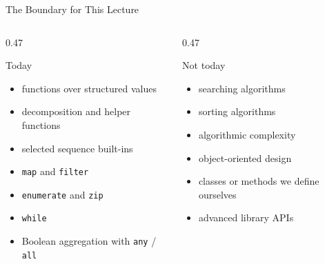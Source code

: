 \documentclass[aspectratio=169,10pt]{beamer}
\begin{document}
\begin{frame}{The Boundary for This Lecture}
  \begin{columns}[T,onlytextwidth]
    \begin{column}{0.47\textwidth}
      \begin{block}{Today}
        \begin{itemize}
          \item functions over structured values
          \item decomposition and helper functions
          \item selected sequence built-ins
          \item \texttt{map} and \texttt{filter}
          \item \texttt{enumerate} and \texttt{zip}
          \item \texttt{while}
          \item Boolean aggregation with \texttt{any} / \texttt{all}
        \end{itemize}
      \end{block}
    \end{column}
    \begin{column}{0.47\textwidth}
      \begin{alertblock}{Not today}
        \begin{itemize}
          \item searching algorithms
          \item sorting algorithms
          \item algorithmic complexity
          \item object-oriented design
          \item classes or methods we define ourselves
          \item advanced library APIs
        \end{itemize}
      \end{alertblock}
    \end{column}
  \end{columns}
\end{frame}

\end{document}
